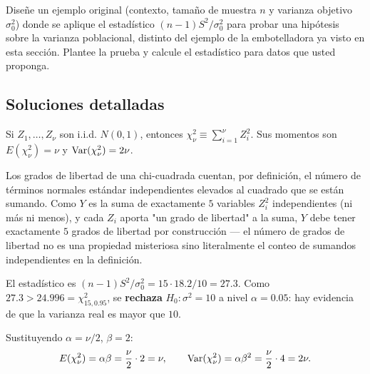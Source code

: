 \begin{problema}
	\label{prob:501e850}
	Diseñe un ejemplo original (contexto, tamaño de muestra $n$ y varianza objetivo $\sigma_0^2$) donde se aplique el estadístico $(n-1)S^2/\sigma_0^2$ para probar una hipótesis sobre la varianza poblacional, distinto del ejemplo de la embotelladora ya visto en esta sección. Plantee la prueba y calcule el estadístico para datos que usted proponga.
\end{problema}

\subsection*{Soluciones detalladas}

\begin{solproblema}[prob:0d114e5]
	Si $Z_1,\ldots,Z_\nu$ son i.i.d. $N(0,1)$, entonces $\chi^2_\nu \equiv \sum_{i=1}^\nu Z_i^2$. Sus momentos son $E(\chi^2_\nu)=\nu$ y $\operatorname{Var}(\chi^2_\nu)=2\nu$.
\end{solproblema}

\begin{solproblema}[prob:66b286b]
	Los grados de libertad de una chi-cuadrada cuentan, por definición, el número de términos normales estándar independientes elevados al cuadrado que se están sumando. Como $Y$ es la suma de exactamente $5$ variables $Z_i^2$ independientes (ni más ni menos), y cada $Z_i$ aporta "un grado de libertad" a la suma, $Y$ debe tener exactamente $5$ grados de libertad por construcción — el número de grados de libertad no es una propiedad misteriosa sino literalmente el conteo de sumandos independientes en la definición.
\end{solproblema}

\begin{solproblema}[prob:94c69e2]
	El estadístico es $(n-1)S^2/\sigma_0^2 = 15\cdot18.2/10 = 27.3$. Como $27.3 > 24.996 = \chi^2_{15,0.95}$, se \textbf{rechaza} $H_0:\sigma^2=10$ a nivel $\alpha=0.05$: hay evidencia de que la varianza real es mayor que $10$.
\end{solproblema}

\begin{solproblema}[prob:b08d077]
	Sustituyendo $\alpha=\nu/2$, $\beta=2$:
	\begin{align*}
		E(\chi^2_\nu) = \alpha\beta = \frac{\nu}{2}\cdot2 = \nu, \qquad \operatorname{Var}(\chi^2_\nu) = \alpha\beta^2 = \frac{\nu}{2}\cdot4 = 2\nu.
	\end{align*}
\end{solproblema}

